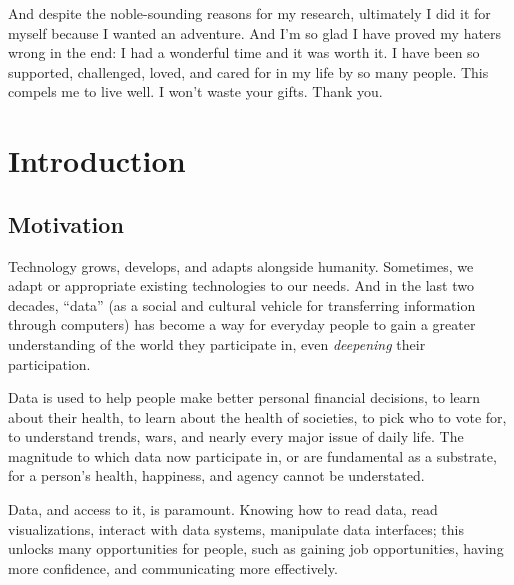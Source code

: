 \documentclass[12pt]{cmuthesis}
\begin{document}
And despite the noble-sounding reasons for my research, ultimately I did it for myself because I wanted an adventure. And I'm so glad I have proved my haters wrong in the end: I had a wonderful time and it was worth it. I have been so supported, challenged, loved, and cared for in my life by so many people. This compels me to live well. I won't waste your gifts. Thank you.

\mainmatter


%
%
%
%
%

\part{Introduction}

\chapter{Motivation}

Technology grows, develops, and adapts alongside humanity. Sometimes, we adapt or appropriate existing technologies to our needs. And in the last two decades, ``data'' (as a social and cultural vehicle for transferring information through computers) has become a way for everyday people to gain a greater understanding of the world they participate in, even \textit{deepening} their participation.

Data is used to help people make better personal financial decisions, to learn about their health, to learn about the health of societies, to pick who to vote for, to understand trends, wars, and nearly every major issue of daily life. The magnitude to which data now participate in, or are fundamental as a substrate, for a person's health, happiness, and agency cannot be understated.

Data, and access to it, is paramount. Knowing how to read data, read visualizations, interact with data systems, manipulate data interfaces; this unlocks many opportunities for people, such as gaining job opportunities, having more confidence, and communicating more effectively.
\end{document}
